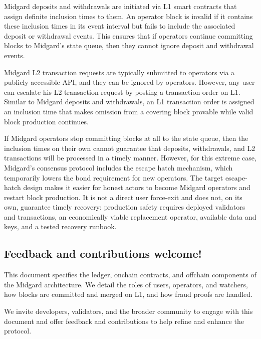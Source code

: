 \documentclass[../midgard.tex]{subfiles}
\begin{document}
Midgard deposits and withdrawals are initiated via L1 smart contracts that assign definite inclusion times to them.
An operator block is invalid if it contains these inclusion times in its event interval but fails to include the associated deposit or withdrawal events.
This ensures that if operators continue committing blocks to Midgard's state queue, then they cannot ignore deposit and withdrawal events.

Midgard L2 transaction requests are typically submitted to operators via a publicly accessible API, and they can be ignored by operators.
However, any user can escalate his L2 transaction request by posting a transaction order on L1.
Similar to Midgard deposits and withdrawals, an L1 transaction order is assigned an inclusion time that makes omission from a covering block provable while valid block production continues.

If Midgard operators stop committing blocks at all to the state queue, then the inclusion times on their own cannot guarantee that deposits, withdrawals, and L2 transactions will be processed in a timely manner.
However, for this extreme case, Midgard's consensus protocol includes the escape hatch mechanism, which temporarily lowers the bond requirement for new operators.
The target escape-hatch design makes it easier for honest actors to become Midgard operators and restart block production.
It is not a direct user force-exit and does not, on its own, guarantee timely recovery: production safety requires deployed validators and transactions, an economically viable replacement operator, available data and keys, and a tested recovery runbook.

\subsection*{Feedback and contributions welcome!}
\label{h:feedback-and-contributions-welcome}

This document specifies the ledger, onchain contracts, and offchain components of the Midgard architecture.
We detail the roles of users, operators, and watchers, how blocks are committed and merged on L1, and how fraud proofs are handled.

We invite developers, validators, and the broader community to engage with this document and offer feedback and contributions to help refine and enhance the protocol.
\end{document}

